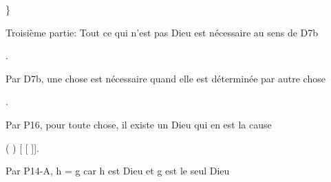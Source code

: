 \documentclass[10pt]{report}
\begin{document}
\begin{coqdoccode}
\coqdocindent{1.00em}
\}\coqdoceol
\coqdocindent{1.00em}
\coqdoceol
\coqdocindent{1.00em}
\begin{coqdoccomment}
\coqdocindent{0.50em}
Troisième\coqdocindent{0.50em}
partie:\coqdocindent{0.50em}
Tout\coqdocindent{0.50em}
ce\coqdocindent{0.50em}
qui\coqdocindent{0.50em}
n'est\coqdocindent{0.50em}
pas\coqdocindent{0.50em}
Dieu\coqdocindent{0.50em}
est\coqdocindent{0.50em}
nécessaire\coqdocindent{0.50em}
au\coqdocindent{0.50em}
sens\coqdocindent{0.50em}
de\coqdocindent{0.50em}
D7b\coqdocindent{0.50em}
\end{coqdoccomment}
\coqdoceol
\coqdocindent{1.00em}
  .\coqdoceol
\coqdocemptyline
\coqdocindent{1.00em}
\begin{coqdoccomment}
\coqdocindent{0.50em}
Par\coqdocindent{0.50em}
D7b,\coqdocindent{0.50em}
une\coqdocindent{0.50em}
chose\coqdocindent{0.50em}
est\coqdocindent{0.50em}
nécessaire\coqdocindent{0.50em}
quand\coqdocindent{0.50em}
elle\coqdocindent{0.50em}
est\coqdocindent{0.50em}
déterminée\coqdocindent{0.50em}
par\coqdocindent{0.50em}
autre\coqdocindent{0.50em}
chose\coqdocindent{0.50em}
\end{coqdoccomment}
\coqdoceol
\coqdocindent{1.00em}
 .\coqdoceol
\coqdocemptyline
\coqdocindent{1.00em}
\begin{coqdoccomment}
\coqdocindent{0.50em}
Par\coqdocindent{0.50em}
P16,\coqdocindent{0.50em}
pour\coqdocindent{0.50em}
toute\coqdocindent{0.50em}
chose,\coqdocindent{0.50em}
il\coqdocindent{0.50em}
existe\coqdocindent{0.50em}
un\coqdocindent{0.50em}
Dieu\coqdocindent{0.50em}
qui\coqdocindent{0.50em}
en\coqdocindent{0.50em}
est\coqdocindent{0.50em}
la\coqdocindent{0.50em}
cause\coqdocindent{0.50em}
\end{coqdoccomment}
\coqdoceol
\coqdocindent{1.00em}
 ( )  [ [ ]].\coqdoceol
\coqdocemptyline
\coqdocindent{1.00em}
\begin{coqdoccomment}
\coqdocindent{0.50em}
Par\coqdocindent{0.50em}
P14-A,\coqdocindent{0.50em}
h\coqdocindent{0.50em}
=\coqdocindent{0.50em}
g\coqdocindent{0.50em}
car\coqdocindent{0.50em}
h\coqdocindent{0.50em}
est\coqdocindent{0.50em}
Dieu\coqdocindent{0.50em}
et\coqdocindent{0.50em}
g\coqdocindent{0.50em}
est\coqdocindent{0.50em}
le\coqdocindent{0.50em}
seul\coqdocindent{0.50em}
Dieu\coqdocindent{0.50em}
\end{coqdoccomment}

\end{coqdoccode}
\end{document}
